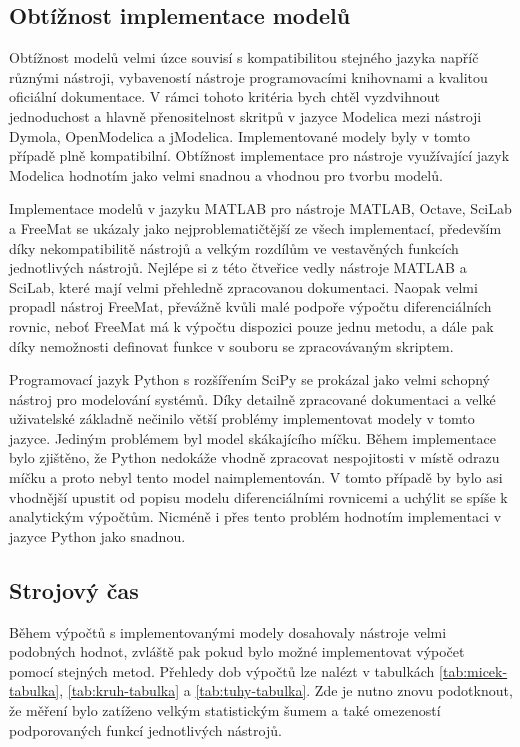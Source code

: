 \subsection*{Obtížnost implementace modelů}
Obtížnost modelů velmi úzce souvisí s kompatibilitou stejného jazyka napříč různými nástroji, vybaveností nástroje programovacími knihovnami a kvalitou oficiální dokumentace. V rámci tohoto kritéria bych chtěl vyzdvihnout jednoduchost a hlavně přenositelnost skritpů v jazyce Modelica mezi nástroji Dymola, OpenModelica a jModelica. Implementované modely byly v tomto případě plně kompatibilní. Obtížnost implementace pro nástroje využívající jazyk Modelica hodnotím jako velmi snadnou a vhodnou pro tvorbu modelů.

Implementace modelů v jazyku MATLAB pro nástroje MATLAB, Octave, SciLab a FreeMat se ukázaly jako nejproblematičtější ze všech implementací, především díky nekompatibilitě nástrojů a velkým rozdílům ve vestavěných funkcích jednotlivých nástrojů. Nejlépe si z této čtveřice vedly nástroje MATLAB a SciLab, které mají velmi přehledně zpracovanou dokumentaci. Naopak velmi propadl nástroj FreeMat, převážně kvůli malé podpoře výpočtu diferenciálních rovnic, neboť FreeMat má k výpočtu dispozici pouze jednu metodu, a dále pak díky nemožnosti definovat funkce v souboru se zpracovávaným skriptem.

Programovací jazyk Python s rozšířením SciPy se prokázal jako velmi schopný nástroj pro modelování systémů. Díky detailně zpracované dokumentaci a velké uživatelské základně nečinilo větší problémy implementovat modely v tomto jazyce. Jediným problémem byl model skákajícího míčku. Během implementace bylo zjištěno, že Python nedokáže vhodně zpracovat nespojitosti v místě odrazu míčku a proto nebyl tento model naimplementován. V tomto případě by bylo asi vhodnější upustit od popisu modelu diferenciálními rovnicemi a uchýlit se spíše k analytickým výpočtům. Nicméně i přes tento problém hodnotím implementaci v jazyce Python jako snadnou.

\subsection*{Strojový čas}
Během výpočtů s implementovanými modely dosahovaly nástroje velmi podobných hodnot, zvláště pak pokud bylo možné implementovat výpočet pomocí stejných metod. Přehledy dob výpočtů lze nalézt v tabulkách \ref{tab:micek-tabulka}, \ref{tab:kruh-tabulka} a \ref{tab:tuhy-tabulka}. Zde je nutno znovu podotknout, že měření bylo zatíženo velkým statistickým šumem a také omezeností podporovaných funkcí jednotlivých nástrojů.

